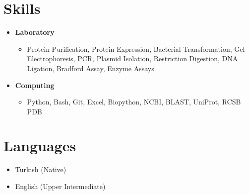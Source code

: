 \documentclass[a4paper,10pt]{article}
\begin{document}
\vspace{0.5em}

\section*{Skills}
\begin{itemize}[left=0pt]
    \item \textbf{Laboratory}    
    \begin{itemize}
        \item {Protein Purification, Protein Expression, Bacterial Transformation, Gel Electrophoresis, PCR, Plasmid Isolation, Restriction Digestion, DNA Ligation, Bradford Assay, Enzyme Assays}
    \end{itemize}
    \item \textbf{Computing}
        \begin{itemize}
            \item {Python, Bash, Git, Excel, Biopython, NCBI, BLAST, UniProt, RCSB PDB}  
        \end{itemize}
\end{itemize}

\vspace{0.5em}

\section*{Languages}
\begin{itemize}[left=0pt]
    \item Turkish (Native)
    \item English (Upper Intermediate)
\end{itemize}
\end{document}

